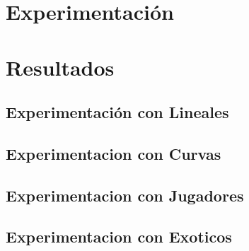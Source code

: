 \section{Experimentación}



\section{Resultados}


\subsection{Experimentación con Lineales}



\subsection{Experimentacion con Curvas}

\subsection{Experimentacion con Jugadores}

\subsection{Experimentacion con Exoticos}
